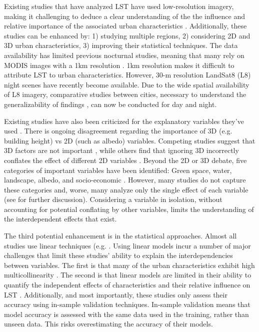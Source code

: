 \documentclass[final,3p,times,twocolumn,sort&compress]{elsarticle}
\begin{document}
Existing studies that have analyzed LST have used low-resolution imagery, making it challenging to deduce a clear understanding of the the influence and relative importance of the associated urban characteristics \cite{Chun2017-mm, Echevarria_Icaza2016-fr, Wicki2017-fv, Zhou2014-wc}. 
Additionally, these studies can be enhanced by: 1) studying multiple regions, 2) considering 2D and 3D urban characteristics, 3) improving their statistical techniques.
The data availability has limited previous nocturnal studies, meaning that many rely on MODIS images with a 1km resolution \cite{Zhou2014-wc, Echevarria_Icaza2016-fr,Wang2019-tree,Peng2012-iy}.
1km resolution makes it difficult to attribute LST to urban characteristics.
However, 30-m resolution LandSat8 (L8) night scenes have recently become available. 
Due to the wide spatial availability of L8 imagery, comparative studies between cities, necessary to understand the generalizability of findings \cite{Peng2012-iy, Hung2006-qy}, can now be conducted for day and night.

Existing studies have also been criticized for the explanatory variables they've used \cite{Chun2017-mm,Peng2018-cp}.
There is ongoing disagreement regarding the importance of 3D (e.g. building height) vs 2D (such as albedo) variables.  
Competing studies suggest that 3D factors are not important \cite{Berger2017-lx}, while others find that ignoring 3D incorrectly conflates the effect of different 2D variables \cite{Chun2017-mm}.
Beyond the 2D or 3D debate, five categories of important variables have been identified: Green space, water, landscape, albedo, and socio-economic \cite{Peng2018-cp}. 
However, many studies do not capture these categories and, worse, many analyze only the single effect of each variable \cite{Zhao2017-cc, Merbitz2012-xz, Unger2004-ry} (see \cite{Peng2018-cp, Chun2017-mm} for further discussion). 
Considering a variable in isolation, without accounting for potential conflating by other variables, limits the understanding of the interdependent effects that exist.

The third potential enhancement is in the statistical approaches.
Almost all studies use linear techniques (e.g. \cite{Li2017-yl, Peng2012-iy, Wicki2017-fv,Zhou2014-wc,Peng2018-cp,Echevarria_Icaza2016-fr,Chun2017-mm,Chun2018-so,Wang2019-tree,Wang2019-water}.
Using linear models incur a number of major challenges that limit these studies' ability to explain the interdependencies between variables. 
The first is that many of the urban characteristics exhibit high multicollinearity \cite{Zhou2014-wc}.
The second is that linear models are limited in their ability to quantify the independent effects of characteristics and their relative influence on LST \cite{Peng2018-cp, Zhou2014-wc}.
Additionally, and most importantly, these studies only assess their accuracy using in-sample validation techniques.
In-sample validation means that model accuracy is assessed with the same data used in the training, rather than unseen data. 
This risks overestimating the accuracy of their models.
\end{document}
